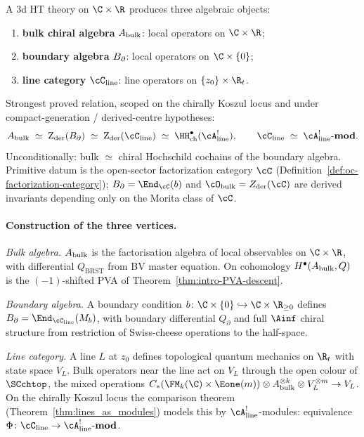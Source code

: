 A 3d HT theory on $\C \times \R$ produces three algebraic
objects:
\begin{enumerate}[label=(\roman*)]
\item \textbf{bulk chiral algebra} $A_{\mathrm{bulk}}$: local operators on
 $\C \times \R$;
\item \textbf{boundary algebra} $B_{\partial}$: local operators on
 $\C \times \{0\}$;
\item \textbf{line category} $\cC_{\mathrm{line}}$: line
 operators on $\{z_0\} \times \R_t$.
\end{enumerate}
Strongest proved relation, scoped on the chirally Koszul
locus and under compact-generation / derived-centre hypotheses:
\begin{equation}
\label{eq:intro-triangle}
\Abulk \;\simeq\;
\Zder(\Bbound) \;\simeq\;
\Zder(\cC_{\mathrm{line}}) \;\simeq\;
\HH^\bullet_{\mathrm{ch}}(\cA^!_{\mathrm{line}}),
\qquad
\cC_{\mathrm{line}} \;\simeq\; \cA^!_{\mathrm{line}}\text{-}\mathbf{mod}.
\end{equation}
Unconditionally: bulk $\simeq$ chiral Hochschild cochains of the
boundary algebra. Primitive datum is the open-sector
factorization category $\cC$
(Definition~\ref{def:oc-factorization-category}); $B_\partial =
\End_\cC(b)$ and $\cO_{\mathrm{bulk}} = Z_{\mathrm{der}}(\cC)$
are derived invariants depending only on the Morita class of
$\cC$.

\paragraph{Construction of the three vertices.}
\emph{Bulk algebra.} $A_{\mathrm{bulk}}$ is the factorisation algebra of
local observables on $\C \times \R$, with differential
$Q_{\mathrm{BRST}}$ from BV master equation. On cohomology
$H^\bullet(A_{\mathrm{bulk}}, Q)$ is the $(-1)$-shifted PVA of
Theorem~\ref{thm:intro-PVA-descent}.

\emph{Boundary algebra.} A boundary condition
$b\colon \C \times \{0\} \hookrightarrow \C \times \R_{\ge 0}$
defines $\Bbound = \End_{\cC_{\mathrm{line}}}(M_b)$, with
boundary differential $Q_{\partial}$ and full $\Ainf$ chiral
structure from restriction of Swiss-cheese operations to the
half-space.

\emph{Line category.} A line $L$ at $z_0$ defines topological
quantum mechanics on $\R_t$ with state space $V_L$. Bulk
operators near the line act on $V_L$ through the open colour of
$\SCchtop$, the mixed operations
$C_\ast(\FM_k(\C) \times \Eone(m)) \otimes \Abulk^{\otimes k}
\otimes V_L^{\otimes m} \to V_L$. On the chirally Koszul locus
the comparison theorem
\textup{(}Theorem~\textup{\ref{thm:lines_as_modules}}\textup{)}
models this by $\cA^!_{\mathrm{line}}$-modules: equivalence
$\Phi\colon \cC_{\mathrm{line}} \to
\cA^!_{\mathrm{line}}\text{-}\mathbf{mod}$.

